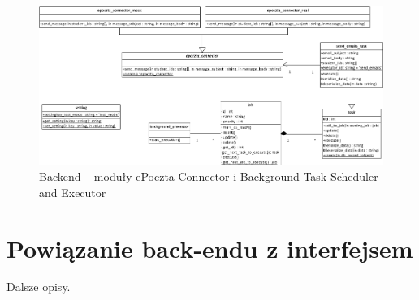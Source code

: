 \begin{landscape}
\begin{figure}[!th]
\centering\includegraphics[width=1.25\textheight]{figures/ePoczta_Connector_Background_Task_Scheduler_and_Executor.png}
\caption{Backend -- moduły ePoczta Connector i Background Task Scheduler and Executor}\label{rys:iquest-backend2}
\end{figure}

\end{landscape}

\section{Powiązanie back-endu z interfejsem}
\label{Chapter66}

{\color{red}Dalsze opisy.}